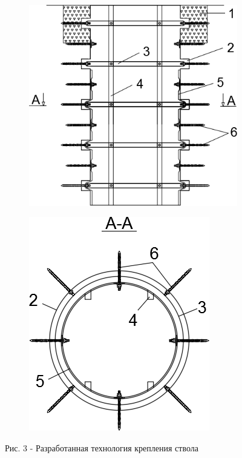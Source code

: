 \begin{figure}[H]
    \centering
    \begin{subfigure}[b]{0.45\textwidth}
        \centering
        \includegraphics[width=\textwidth]{assets/1131}
    \end{subfigure}
    \hfill
    \begin{subfigure}[b]{0.4\textwidth}
        \centering
        \includegraphics[width=\textwidth]{assets/1132}
    \end{subfigure}
    \caption*{Рис. 3 - Разработанная технология крепления ствола}
\end{figure}

